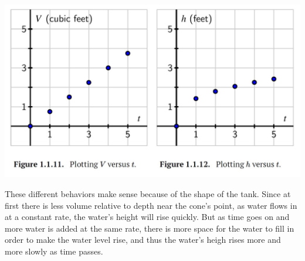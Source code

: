 \documentclass{ximera}
\begin{document}
\includegraphics[width=\textwidth]{APCfigure1.1.11.jpg}

These different behaviors make sense because of the shape of the tank.  Since at first there is less volume relative to depth near the cone's point, as water flows in at a constant rate, the water's height will rise quickly.  But as time goes on and more water is added at the same rate, there is more space for the water to fill in order to make the water level rise, and thus the water's heigh rises more and more slowly as time passes.%
\end{document}
